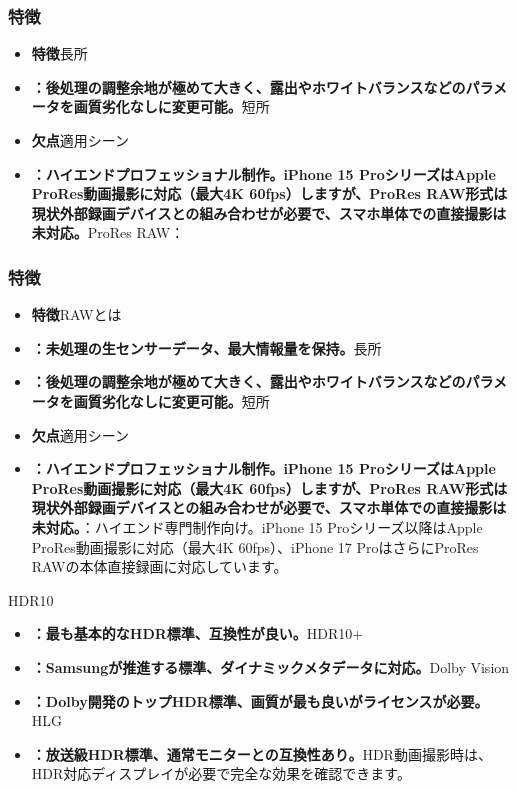 \subsubsection*{特徴}

\begin{itemize}
  \item \textbf{特徴}長所
  \item \textbf{：後処理の調整余地が極めて大きく、露出やホワイトバランスなどのパラメータを画質劣化なしに変更可能。}短所
  \item \textbf{欠点}適用シーン
  \item \textbf{：ハイエンドプロフェッショナル制作。iPhone 15 ProシリーズはApple ProRes動画撮影に対応（最大4K 60fps）しますが、ProRes RAW形式は現状外部録画デバイスとの組み合わせが必要で、スマホ単体での直接撮影は未対応。}ProRes RAW：
\end{itemize}

\subsubsection*{特徴}

\begin{itemize}
  \item \textbf{特徴}RAWとは
  \item \textbf{：未処理の生センサーデータ、最大情報量を保持。}長所
  \item \textbf{：後処理の調整余地が極めて大きく、露出やホワイトバランスなどのパラメータを画質劣化なしに変更可能。}短所
  \item \textbf{欠点}適用シーン
  \item \textbf{：ハイエンドプロフェッショナル制作。iPhone 15 ProシリーズはApple ProRes動画撮影に対応（最大4K 60fps）しますが、ProRes RAW形式は現状外部録画デバイスとの組み合わせが必要で、スマホ単体での直接撮影は未対応。}：ハイエンド専門制作向け。iPhone 15 Proシリーズ以降はApple ProRes動画撮影に対応（最大4K 60fps）、iPhone 17 ProはさらにProRes RAWの本体直接録画に対応しています。
\end{itemize}


HDR10

\begin{itemize}
  \item \textbf{：最も基本的なHDR標準、互換性が良い。}HDR10+
  \item \textbf{：Samsungが推進する標準、ダイナミックメタデータに対応。}Dolby Vision
  \item \textbf{：Dolby開発のトップHDR標準、画質が最も良いがライセンスが必要。}HLG
  \item \textbf{：放送級HDR標準、通常モニターとの互換性あり。}HDR動画撮影時は、HDR対応ディスプレイが必要で完全な効果を確認できます。
\end{itemize}

